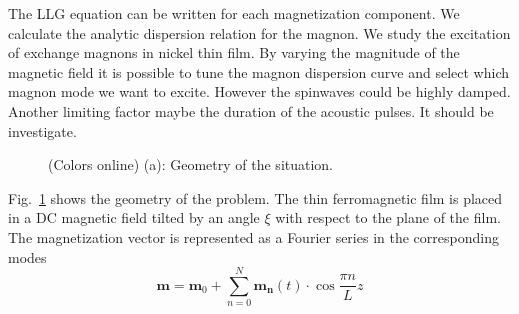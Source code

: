 \documentclass[%
superscriptaddress,
preprint,
showpacs,
amsmath,
amssymb,
aps,
prl,
]{revtex4-1}
\begin{document}
The LLG equation can be written for each magnetization component. We calculate the analytic dispersion relation for the magnon.
We study the excitation of exchange magnons in nickel thin film. By varying the magnitude of the magnetic field it is possible to tune the magnon dispersion curve and select which magnon mode we want to excite. However the spinwaves could be highly damped.
Another limiting factor maybe the duration of the acoustic pulses. It should be investigate.
\begin{figure}[ht]
	\centering
	\hspace{0.1\columnwidth} 
	\caption{(Colors online) (a): Geometry of the situation.}
	\label{fig:schemes}
\end{figure}
Fig.~\ref{fig:schemes} shows the geometry of the problem. The thin ferromagnetic film is placed in a DC magnetic field tilted by an angle $\xi$ with respect to the plane of the film. The magnetization vector is represented as a Fourier series in the corresponding modes 
\begin{equation}
	\mathbf{m} = \mathbf{m}_0 + \sum_{n=0}^{N}{\mathbf{m_n}(t)} \cdot \cos{\frac{\pi n}{L}z}
	\label{eq:Fourier}
\end{equation}
\end{document}
